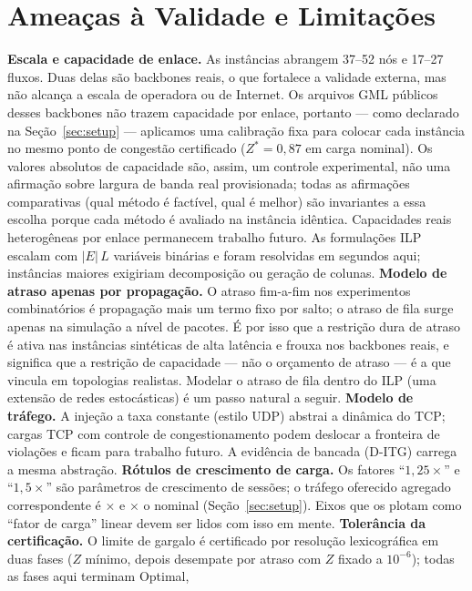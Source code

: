 \documentclass[journal]{IEEEtran}
\begin{document}
\section{Ameaças à Validade e Limitações}
\label{sec:limits}
\textbf{Escala e capacidade de enlace.} As instâncias abrangem 37--52 nós e
17--27 fluxos. Duas delas são backbones reais, o que fortalece a validade
externa, mas não alcança a escala de operadora ou de Internet. Os arquivos
GML públicos desses backbones não trazem capacidade por enlace, portanto ---
como declarado na Seção~\ref{sec:setup} --- aplicamos uma calibração fixa
para colocar cada instância no mesmo ponto de congestão certificado
($Z^{*}=0{,}87$ em carga nominal). Os valores absolutos de capacidade são,
assim, um controle experimental, não uma afirmação sobre largura de banda
real provisionada; todas as afirmações comparativas (qual método é factível,
qual é melhor) são invariantes a essa escolha porque cada método é avaliado
na instância idêntica. Capacidades reais heterogêneas por enlace permanecem
trabalho futuro. As formulações ILP
escalam com $|E|\,L$ variáveis binárias e foram resolvidas em segundos aqui;
instâncias maiores exigiriam decomposição ou geração de colunas.
\textbf{Modelo de atraso apenas por propagação.} O atraso fim-a-fim nos
experimentos combinatórios é propagação mais um termo fixo por salto; o
atraso de fila surge apenas na simulação a nível de pacotes. É por isso que a
restrição dura de atraso é ativa nas instâncias sintéticas de alta latência e
frouxa nos backbones reais, e significa que a restrição de capacidade --- não
o orçamento de atraso --- é a que vincula em topologias realistas. Modelar o
atraso de fila dentro do ILP (uma extensão de redes estocásticas) é um passo
natural a seguir.
\textbf{Modelo de tráfego.} A injeção a taxa constante (estilo UDP) abstrai
a dinâmica do TCP; cargas TCP com controle de congestionamento podem
deslocar a fronteira de violações e ficam para trabalho futuro. A evidência
de bancada (D-ITG) carrega a mesma abstração.
\textbf{Rótulos de crescimento de carga.} Os fatores ``$1{,}25\times$'' e
``$1{,}5\times$'' são parâmetros de crescimento de sessões; o tráfego
oferecido agregado correspondente é \LoadRatioHigh$\times$ e
\LoadRatioMax$\times$ o nominal (Seção~\ref{sec:setup}). Eixos que os
plotam como ``fator de carga'' linear devem ser lidos com isso em mente.
\textbf{Tolerância da certificação.} O limite de gargalo é certificado por
resolução lexicográfica em duas fases ($Z$ mínimo, depois desempate por
atraso com $Z$ fixado a $10^{-6}$); todas as fases aqui terminam Optimal,
\end{document}
